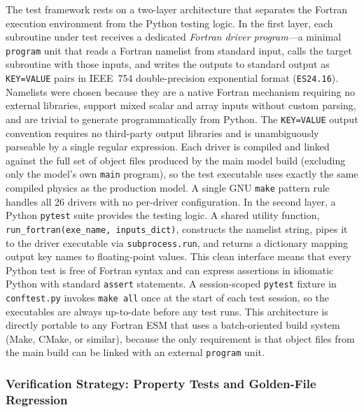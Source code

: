 The test framework rests on a two-layer architecture that separates the
Fortran execution environment from the Python testing logic.  In the first layer,
each subroutine under test receives a dedicated \emph{Fortran driver program}—a
minimal \texttt{program} unit that reads a Fortran namelist from standard input,
calls the target subroutine with those inputs, and writes the outputs to standard
output as \texttt{KEY=VALUE} pairs in IEEE~754 double-precision exponential format
(\texttt{ES24.16}).  Namelists were chosen because they are a native Fortran
mechanism requiring no external libraries, support mixed scalar and array inputs
without custom parsing, and are trivial to generate programmatically from Python.
The \texttt{KEY=VALUE} output convention requires no third-party output libraries
and is unambiguously parseable by a single regular expression.  Each driver is
compiled and linked against the full set of object files produced by the main model
build (excluding only the model's own \texttt{main} program), so the test executable
uses exactly the same compiled physics as the production model.  A single GNU
\texttt{make} pattern rule handles all 26 drivers with no per-driver configuration.
In the second layer, a Python \texttt{pytest} suite provides the testing logic.  A
shared utility function, \texttt{run\_fortran(exe\_name, inputs\_dict)}, constructs
the namelist string, pipes it to the driver executable via \texttt{subprocess.run},
and returns a dictionary mapping output key names to floating-point values.  This
clean interface means that every Python test is free of Fortran syntax and can
express assertions in idiomatic Python with standard \texttt{assert} statements.  A
session-scoped \texttt{pytest} fixture in \texttt{conftest.py} invokes \texttt{make
all} once at the start of each test session, so the executables are always
up-to-date before any test runs.  This architecture is directly portable to any
Fortran ESM that uses a batch-oriented build system (Make, CMake, or similar),
because the only requirement is that object files from the main build can be linked
with an external \texttt{program} unit.

\subsubsection{Verification Strategy: Property Tests and Golden-File Regression}

